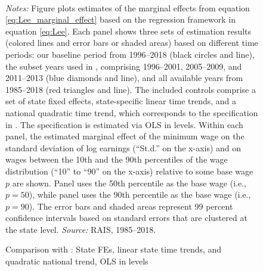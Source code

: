 \begin{figure}[!htb]
  \centering
  \caption{Comparison with \citet{Haanwinckel2020_appendix}: State FEs, linear state time trends, and quadratic national trend, OLS in levels\label{app_fig_haanwinckel_state_trend_1_ntrend_2_ols_levels}}
  \prefigvspace
  \hspace*{\fill}%
  \centerhfill[\qquad\qquad\qquad\qquad\qquad]
  \hspace*{\fill}
  \\
  \postfigvspace
  \begin{minipage}[t]{1\columnwidth}%
    \begin{spacing}{0.75}
      \emph{\scriptsize{}Notes:}{\scriptsize{} Figure plots estimates of the marginal effects from equation \eqref{eq:Lee_marginal_effect} based on the regression framework in equation \eqref{eq:Lee}. Each panel shows three sets of estimation results (colored lines and error bars or shaded areas) based on different time periods: our baseline period from 1996--2018 (black circles and line), the subset years used in , comprising 1996--2001, 2005--2009, and 2011--2013 (blue diamonds and line), and all available years from 1985--2018 (red triangles and line). The included controls comprise a set of state fixed effects, state-specific linear time trends, and a national quadratic time trend, which corresponds to the specification in . The specification is estimated via OLS in levels. Within each panel, the estimated marginal effect of the minimum wage on the standard deviation of log earnings (``St.d.'' on the x-axis) and on wages between the 10th and the 90th percentiles of the wage distribution (``10'' to ``90'' on the x-axis) relative to some base wage $p$ are shown. Panel  uses the 50th percentile as the base wage (i.e., $p=50$), while panel  uses the 90th percentile as the base wage (i.e., $p=90$). The error bars and shaded areas represent 99 percent confidence intervals based on standard errors that are clustered at the state level. %
      \emph{\scriptsize{}Source: } RAIS, 1985--2018.}
    \end{spacing}
  \end{minipage}
\end{figure}



